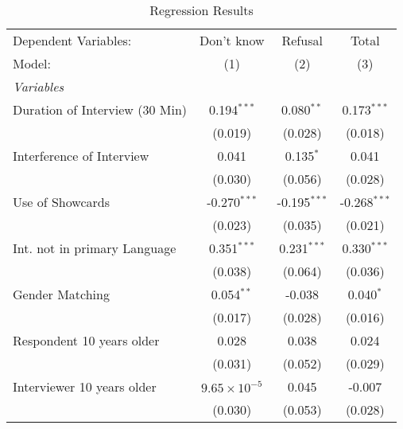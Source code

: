 
\begin{table}[htbp]
   \caption{Regression Results}
   \centering
   \begin{tabular}{lccc}
      \tabularnewline \midrule \midrule
      Dependent Variables:           & Don't know              & Refusal                 & Total\\  
      Model:                         & (1)                     & (2)                     & (3)\\  
      \midrule
      \emph{Variables}\\
      Duration of Interview (30 Min) & 0.194$^{***}$           & 0.080$^{**}$            & 0.173$^{***}$\\   
                                     & (0.019)                 & (0.028)                 & (0.018)\\   
      Interference of Interview      & 0.041                   & 0.135$^{*}$             & 0.041\\   
                                     & (0.030)                 & (0.056)                 & (0.028)\\   
      Use of Showcards               & -0.270$^{***}$          & -0.195$^{***}$          & -0.268$^{***}$\\   
                                     & (0.023)                 & (0.035)                 & (0.021)\\   
      Int. not in primary Language   & 0.351$^{***}$           & 0.231$^{***}$           & 0.330$^{***}$\\   
                                     & (0.038)                 & (0.064)                 & (0.036)\\   
      Gender Matching                & 0.054$^{**}$            & -0.038                  & 0.040$^{*}$\\   
                                     & (0.017)                 & (0.028)                 & (0.016)\\   
      Respondent 10 years older      & 0.028                   & 0.038                   & 0.024\\   
                                     & (0.031)                 & (0.052)                 & (0.029)\\   
      Interviewer 10 years older     & $9.65\times 10^{-5}$    & 0.045                   & -0.007\\   
                                     & (0.030)                 & (0.053)                 & (0.028)\\   

\end{tabular}
\end{table}
